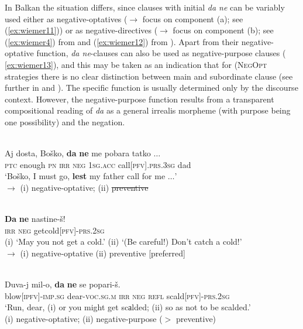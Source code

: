 \documentclass[output=paper,colorlinks,citecolor=brown]{langscibook}
\begin{document}
In Balkan  the situation differs, since clauses with initial \textit{da ne} can be variably used either as negative-optatives (${\rightarrow}$ focus on component (a); see (\ref{ex:wiemer11})) or as negative-directives (${\rightarrow}$ focus on component (b); see (\ref{ex:wiemer4}) from  and (\ref{ex:wiemer12}) from ). Apart from their negative-optative function, \textit{da ne}-clauses can also be used as negative-purpose clauses ( \ref{ex:wiemer13}), and this may be taken as an indication that for (\textsc{NegOpt} strategies there is no clear distinction between main and subordinate clause (see further in  and ). The specific function is usually determined only by the discourse context. However, the negative-purpose function results from a transparent compositional reading of \textit{da} as a general irrealis morpheme (with purpose being one possibility) and the negation.


\ea
\label{ex:wiemer11} 
\\
\gll Aj dosta, Boško, \textbf{da} \textbf{ne} me pobara tatko $\ldots$\\
\textsc{ptc} enough \textsc{pn} \textsc{irr} \textsc{neg} \textsc{1sg.acc} call\textsc{[pfv].prs.3sg} dad \\
\glt `Boško, I must go, \textbf{lest} my father call for me $\ldots$' \\
$\rightarrow$ (i) negative-optative; (ii) \sout{preventive}
\z

\ea
\label{ex:wiemer12} 
 \\
\gll \textbf{Da} \textbf{ne} nastine-š! \\
\textsc{irr} \textsc{neg} get\textunderscore cold\textsc{[pfv]-prs.2sg}\\
\glt (i) `May you not get a cold.' (ii) `(Be careful!) Don't catch a cold!' \\
$\rightarrow$ (i) negative-optative (ii) preventive [preferred]
\z

\ea
\label{ex:wiemer13} 
 \\
\gll Duva-j mil-o, \textbf{da} \textbf{ne} se popari-š. \\
blow\textsc{[ipfv]-imp.sg} dear-\textsc{voc.sg.m} \textsc{irr} \textsc{neg} \textsc{refl} scald\textsc{[pfv]-prs.2sg}\\
\glt `Run, dear, (i) or you might get scаlded; (ii) so as not to be scalded.' \\
(i) negative-optative; (ii) negative-purpose ($>$ preventive) \\
\z
\end{document}
